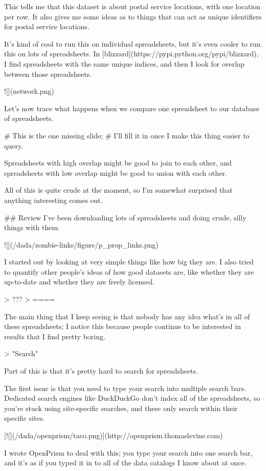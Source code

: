 \documentclass{acm_proc_article-sp}
\begin{document}
This tells me that this dataset is about postal service locations,
with one location per row. It also gives me some ideas as to things that can
act as unique identifiers for postal service locations.

It's kind of cool to run this on individual spreadsheets, but it's even cooler
to run this on lots of spreadsheets.
In [blizzard](https://pypi.python.org/pypi/blizzard), I find spreadsheets with
the same unique indices, and then I look for overlap between those spreadsheets.

![](network.png)

Let's now trace what happens when we compare one spreadsheet to our database
of spreadsheets.

    # This is the one missing slide;
    # I'll fill it in once I make this thing easier to query.

Spreadsheets with high overlap might be good to join to each other, and
spreadsheets with low overlap might be good to union with each other.

All of this is quite crude at the moment, so I'm somewhat surprised that
anything interesting comes out.

## Review
I've been downloading lots of spreadsheets and doing crude, silly things
with them.

![](/dada/zombie-links/figure/p_prop_links.png)

I started out by looking at very simple things like how big they are.
I also tried to quantify other people's ideas of how good datasets are,
like whether they are up-to-date and whether they are freely licensed.

> ???
> ====

The main thing that I keep seeing is that nobody has any idea what's in all
of these spreadsheets; I notice this because people continue to be interested
in results that I find pretty boring.

> "Search"

Part of this is that it's pretty hard to search for spreadsheets.

The first issue is that you need to type your search into multiple search
bars. Dedicated search engines like DuckDuckGo don't index all of the
spreadsheets, so you're stuck using site-specific searches, and these only
search within their specific sites.

[![](/dada/openprism/taco.png)](http://openprism.thomaslevine.com)

I wrote OpenPrism to deal with this; you type your search into one search
bar, and it's as if you typed it in to all of the data catalogs I know about
at once.
\end{document}
